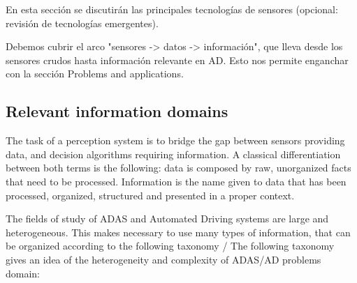 
En esta sección se discutirán las principales tecnologías de sensores (opcional: revisión de tecnologías emergentes).

Debemos cubrir el arco "sensores -> datos -> información", que lleva desde los sensores crudos hasta información relevante en AD. Esto nos permite enganchar con la sección Problems and applications.




\subsection{Relevant information domains}

The task of a perception system is to bridge the gap between sensors providing 
data, and decision algorithms requiring information.
A classical differentiation between both terms is the following: data is 
composed by raw, unorganized facts that need to be processed. 
Information is the name given to data that has been processed, organized, 
structured and presented in a proper context.

The fields of study of ADAS and Automated Driving systems are large and 
heterogeneous.
This makes necessary to use many types of information, that can be organized 
according to the following taxonomy / The following taxonomy gives an idea of 
the heterogeneity and complexity of ADAS/AD problems domain:


